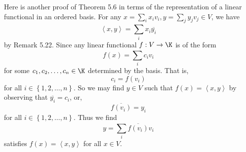 \documentclass[linearalgebraII]{subfiles}
\begin{document}
    \begin{remark}
        Here is another proof of Theorem 5.6 in terms of the representation of a linear functional in an ordered basis. For any $x=\sum^{}_{i} x_iv_i, y=\sum^{}_{j} y_jv_j\in V$, we have
        \begin{equation*}
            \left\langle x, y\right\rangle = \sum^{}_{i} x_i \overline{y_i}
        \end{equation*}
        by Remark 5.22. Since any linear functional $f:V\to\K$ is of the form
        \begin{equation*}
            f(x) = \sum^{}_{i} c_iv_i
        \end{equation*}
        for some $c_1,c_2,\ldots,c_n\in\K$ determined by the basis. That is,
        \begin{equation*}
            c_i = f\left( v_i \right) 
        \end{equation*}
        for all $i\in\left\lbrace 1,2,\ldots,n \right\rbrace$. So we may find $y\in V$ such that $f(x) = \left\langle x, y\right\rangle$ by observing that $\overline{y_i} = c_i$, or,
        \begin{equation*}
            \overline{f\left( v_i \right) } = y_i
        \end{equation*}
        for all $i\in \left\lbrace 1,2,\ldots,n \right\rbrace$. Thus we find
        \begin{equation*}
            y = \sum^{}_{i} \overline{f\left( v_i \right) }v_i
        \end{equation*}
        satisfies $f(x) = \left\langle x, y\right\rangle$ for all $x\in V$.
    \end{remark}
\end{document}

